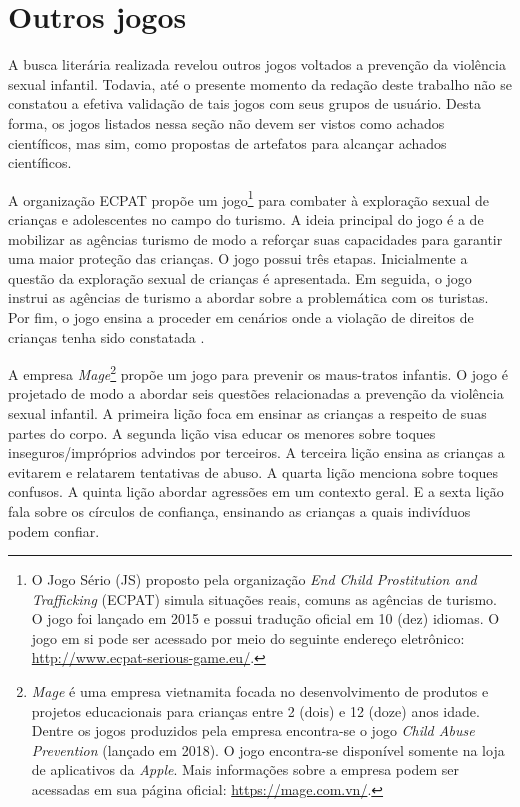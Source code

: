 \section{Outros jogos}\label{sssec:outros}

A busca literária realizada revelou outros jogos voltados a prevenção da violência sexual infantil. Todavia, até o presente momento da redação deste trabalho não se constatou a efetiva validação de tais jogos com seus grupos de usuário. Desta forma, os jogos listados nessa seção não devem ser vistos como achados científicos, mas sim, como propostas de artefatos para alcançar achados científicos.

A organização \ac{ECPAT} propõe um jogo\footnote{O Jogo Sério (JS) proposto pela organização \textit{End Child Prostitution and Trafficking} (ECPAT) simula situações reais, comuns as agências de turismo. O jogo foi lançado em 2015 e possui tradução oficial em 10 (dez) idiomas. O jogo em si pode ser acessado por meio do seguinte endereço eletrônico: \url{http://www.ecpat-serious-game.eu/}.} para combater à exploração sexual de crianças e adolescentes no campo do turismo. A ideia principal do jogo é a de mobilizar as agências turismo de modo a reforçar suas capacidades para garantir uma maior proteção das crianças. O jogo possui três etapas. Inicialmente a questão da exploração sexual de crianças é apresentada. Em seguida, o jogo instrui as agências de turismo a abordar sobre a problemática com os turistas. Por fim, o jogo ensina a proceder em cenários onde a violação de direitos de crianças tenha sido constatada \cite{gopalan2018social}. 

A empresa \textit{Mage}\footnote{\textit{Mage} é uma empresa vietnamita focada no desenvolvimento de produtos e projetos educacionais para crianças entre 2 (dois) e 12 (doze) anos idade. Dentre os jogos produzidos pela empresa encontra-se o jogo \textit{Child Abuse Prevention} (lançado em 2018). O jogo encontra-se disponível somente na loja de aplicativos da \textit{Apple}. Mais informações sobre a empresa podem ser acessadas em sua página oficial: \url{https://mage.com.vn/}.} propõe um jogo para prevenir os maus-tratos infantis. O jogo é projetado de modo a abordar seis questões relacionadas a prevenção da violência sexual infantil. A primeira lição foca em ensinar as crianças a respeito de suas partes do corpo. A segunda lição visa educar os menores sobre toques inseguros/impróprios advindos por terceiros. A terceira lição ensina as crianças a evitarem e relatarem tentativas de abuso. A quarta lição menciona sobre toques confusos. A quinta lição abordar agressões em um contexto geral. E a sexta lição fala sobre os círculos de confiança, ensinando as crianças a quais indivíduos podem confiar.

